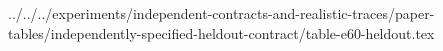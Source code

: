 ../../../experiments/independent-contracts-and-realistic-traces/paper-tables/independently-specified-heldout-contract/table-e60-heldout.tex